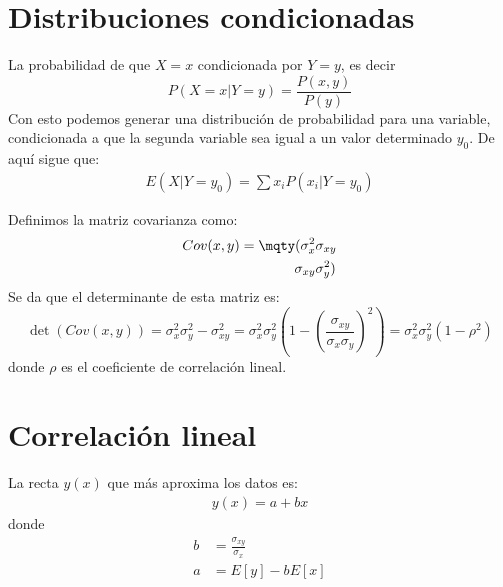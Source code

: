 \documentclass{./Probabilidad.tex}
\begin{document}
\section{Distribuciones condicionadas}
La probabilidad de que $X = x$ condicionada por $Y = y$, es decir  
\[
 P(X=x | Y=y) = \frac{P(x,y)}{P(y)} 
\]
Con esto podemos generar una distribución de probabilidad para una variable,
condicionada a que la segunda variable sea igual a un valor determinado $y_0$.
De aquí sigue que:
\begin{equation}
  \begin{split}
   E(X|Y=y_0) = \sum x_{i} P(x_{i}|Y=y_0)
  \end{split}
\end{equation}
\begin{defin}
Definimos la matriz covarianza como:
\begin{equation}
	\begin{split}
		Cov(x,y) = \mqty(
		\sigma_{x} ^{2} & \sigma_{xy}\\ \sigma_{xy} & \sigma_{y} ^{2}
		)
	\end{split}
\end{equation}
Se da que el determinante de esta matriz es:
\[
	\det(Cov(x,y)) = \sigma_{x}^{2}\sigma_{y}^{2} - \sigma_{xy}^{2} =
	\sigma_{x}^{2}\sigma_{y}^{2}(1- ( \frac{\sigma_{xy}}{\sigma_{x}\sigma_{y}})^{2}) = \sigma_{x}^{2}\sigma_{y}^{2}(1-\rho ^{2})
\]
donde $\rho$ es el coeficiente de correlación lineal. 
\end{defin}
\section{Correlación lineal}
La recta $y(x)$ que más aproxima los datos es:
\begin{equation}
	\begin{split}
		y(x) = a+bx
	\end{split}
\end{equation}
donde
\begin{equation}
	\begin{split}
		b &= \frac{\sigma_{xy}}{\sigma_{x}}\\
		a &= E[y] - bE[x]
	\end{split}
\end{equation}
\end{document}

